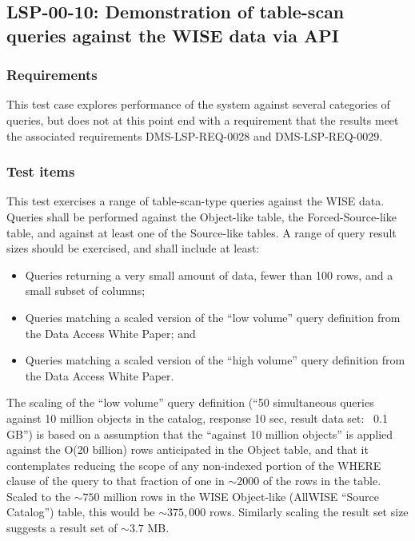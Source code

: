 \subsection{LSP-00-10: Demonstration of table-scan queries against the WISE data via API}
\label{lsp-00-10}

\subsubsection{Requirements}

This test case explores performance of the system against several categories of queries, but does not at this point end with a requirement that the results meet the associated requirements DMS-LSP-REQ-0028 and DMS-LSP-REQ-0029.

\subsubsection{Test items}

This test exercises a range of table-scan-type queries against the WISE data.
Queries shall be performed against the Object-like table, the Forced-Source-like table, and against at least one of the Source-like tables.
A range of query result sizes should be exercised, and shall include at least:

\begin{itemize}

  \item{Queries returning a very small amount of data, fewer than 100 rows, and a small subset of columns;}
  \item{Queries matching a scaled version of the ``low volume'' query definition from the Data Access White Paper; and}
  \item{Queries matching a scaled version of the ``high volume'' query definition from the Data Access White Paper.}

\end{itemize}

The scaling of the ``low volume'' query definition (``50 simultaneous queries against 10 million objects in the catalog, response 10 sec, result data set: ~0.1 GB'') is based on a assumption that the ``against 10 million objects'' is applied against the O(20 billion) rows anticipated in the Object table,
and that it contemplates reducing the scope of any non-indexed portion of the WHERE clause of the query to that fraction of one in $\sim 2000$ of the rows in the table.
Scaled to the $\sim 750$ million rows in the WISE Object-like (AllWISE ``Source Catalog'') table, this would be $\sim 375,000$ rows.
Similarly scaling the result set size suggests a result set of $\sim 3.7$ MB.

